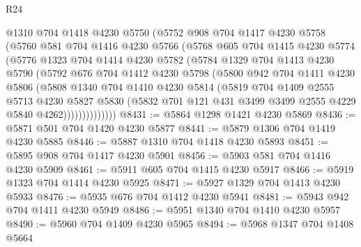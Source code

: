 \begin{lexlean}{R24}
\begin{coremodule}
            @1310
            @704
            @1418
            @4230
            @5750
            (@5752
              @908
              @704
              @1417
              @4230
              @5758
              (@5760
                @581
                @704
                @1416
                @4230
                @5766
                (@5768
                  @605
                  @704
                  @1415
                  @4230
                  @5774
                  (@5776
                    @1323
                    @704
                    @1414
                    @4230
                    @5782
                    (@5784
                      @1329
                      @704
                      @1413
                      @4230
                      @5790
                      (@5792
                        @676
                        @704
                        @1412
                        @4230
                        @5798
                        (@5800
                          @942
                          @704
                          @1411
                          @4230
                          @5806
                          (@5808
                            @1340
                            @704
                            @1410
                            @4230
                            @5814
                            (@5819
                              @704
                              @1409
                              @2555
                              @5713
                              @4230
                              @5827
                              @5830
                              (@5832
                                @701
                                @121
                                @431
                                @3499
                                @3499
                                @2555
                                @4229
                                @5840
                                @4262))))))))))))))
@8431 := @5864 @1298 @1421 @4230 @5869
@8436 := @5871 @501 @704 @1420 @4230 @5877
@8441 := @5879 @1306 @704 @1419 @4230 @5885
@8446 := @5887 @1310 @704 @1418 @4230 @5893
@8451 := @5895 @908 @704 @1417 @4230 @5901
@8456 := @5903 @581 @704 @1416 @4230 @5909
@8461 := @5911 @605 @704 @1415 @4230 @5917
@8466 := @5919 @1323 @704 @1414 @4230 @5925
@8471 := @5927 @1329 @704 @1413 @4230 @5933
@8476 := @5935 @676 @704 @1412 @4230 @5941
@8481 := @5943 @942 @704 @1411 @4230 @5949
@8486 := @5951 @1340 @704 @1410 @4230 @5957
@8490 := @5960 @704 @1409 @4230 @5965
@8494 := @5968 @1347 @704 @1408 @5664

\end{coremodule}
\end{lexlean}
